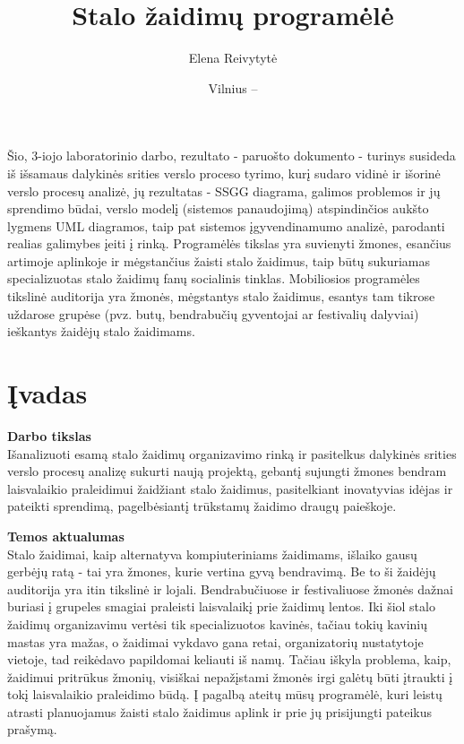 \documentclass{VUMIFPSkursinis}
\title{Stalo žaidimų programėlė}
\author{Elena Reivytytė}
\date{Vilnius – \the\year}
\begin{document}
\maketitle

Šio, 3-iojo laboratorinio darbo, rezultato - paruošto dokumento  - turinys susideda iš išsamaus dalykinės srities verslo proceso tyrimo, kurį sudaro vidinė ir išorinė verslo procesų analizė, jų rezultatas - SSGG diagrama,  galimos problemos ir jų sprendimo būdai, verslo modelį (sistemos panaudojimą) atspindinčios aukšto lygmens UML diagramos, taip pat sistemos įgyvendinamumo analizė, parodanti realias galimybes įeiti į rinką. Programėlės tikslas yra suvienyti žmones, esančius artimoje aplinkoje ir mėgstančius žaisti stalo žaidimus, taip būtų sukuriamas specializuotas stalo žaidimų fanų socialinis tinklas. Mobiliosios programėles tikslinė auditorija yra žmonės, mėgstantys stalo žaidimus, esantys tam tikrose uždarose grupėse (pvz. butų, bendrabučių gyventojai ar festivalių dalyviai) ieškantys žaidėjų stalo žaidimams. 

\tableofcontents

\section{Įvadas}
\textbf{Darbo tikslas}\\
Išanalizuoti esamą stalo žaidimų organizavimo rinką ir pasitelkus dalykinės srities verslo procesų analizę sukurti naują projektą, 
gebantį sujungti žmones bendram laisvalaikio praleidimui žaidžiant stalo žaidimus, pasitelkiant 
inovatyvias idėjas ir pateikti sprendimą, pagelbėsiantį trūkstamų žaidimo draugų paieškoje.

\textbf{Temos aktualumas}\\
Stalo žaidimai, kaip alternatyva kompiuteriniams žaidimams, išlaiko gausų gerbėjų ratą - tai 
yra žmones, kurie vertina gyvą bendravimą. Be to ši žaidėjų auditorija yra itin tikslinė ir 
lojali. Bendrabučiuose ir festivaliuose žmonės dažnai buriasi į grupeles smagiai praleisti 
laisvalaikį prie žaidimų lentos. Iki šiol stalo žaidimų organizavimu vertėsi tik specializuotos 
kavinės, tačiau tokių kavinių mastas yra mažas, o žaidimai vykdavo gana retai, organizatorių 
nustatytoje vietoje, tad reikėdavo papildomai keliauti iš namų. Tačiau iškyla problema, kaip, 
žaidimui pritrūkus žmonių, visiškai nepažįstami žmonės irgi galėtų būti įtraukti į tokį laisvalaikio 
praleidimo būdą. Į pagalbą ateitų mūsų programėlė, kuri leistų atrasti planuojamus žaisti stalo 
žaidimus aplink ir prie jų prisijungti pateikus prašymą.
\end{document}
